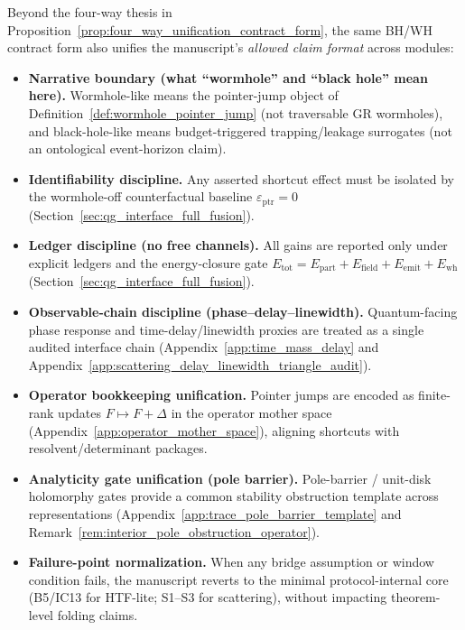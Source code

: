 \begin{remark}
\label{rem:bh_wh_additional_unifications_checklist}
\AuditTag Beyond the four-way thesis in Proposition~\ref{prop:four_way_unification_contract_form}, the same BH/WH contract form also unifies the manuscript's \emph{allowed claim format} across modules:
\begin{itemize}
\item \textbf{Narrative boundary (what ``wormhole'' and ``black hole'' mean here).}
Wormhole-like means the pointer-jump object of Definition~\ref{def:wormhole_pointer_jump} (not traversable GR wormholes), and black-hole-like means budget-triggered trapping/leakage surrogates (not an ontological event-horizon claim).
\item \textbf{Identifiability discipline.}
Any asserted shortcut effect must be isolated by the wormhole-off counterfactual baseline $\varepsilon_{\mathrm{ptr}}=0$ (Section~\ref{sec:qg_interface_full_fusion}).
\item \textbf{Ledger discipline (no free channels).}
All gains are reported only under explicit ledgers and the energy-closure gate
$E_{\mathrm{tot}}=E_{\mathrm{part}}+E_{\mathrm{field}}+E_{\mathrm{emit}}+E_{\mathrm{wh}}$ (Section~\ref{sec:qg_interface_full_fusion}).
\item \textbf{Observable-chain discipline (phase--delay--linewidth).}
Quantum-facing phase response and time-delay/linewidth proxies are treated as a single audited interface chain (Appendix~\ref{app:time_mass_delay} and Appendix~\ref{app:scattering_delay_linewidth_triangle_audit}).
\item \textbf{Operator bookkeeping unification.}
Pointer jumps are encoded as finite-rank updates $F\mapsto F+\Delta$ in the operator mother space (Appendix~\ref{app:operator_mother_space}), aligning shortcuts with resolvent/determinant packages.
\item \textbf{Analyticity gate unification (pole barrier).}
Pole-barrier / unit-disk holomorphy gates provide a common stability obstruction template across representations (Appendix~\ref{app:trace_pole_barrier_template} and Remark~\ref{rem:interior_pole_obstruction_operator}).
\item \textbf{Failure-point normalization.}
When any bridge assumption or window condition fails, the manuscript reverts to the minimal protocol-internal core (B5/IC13 for HTF-lite; S1--S3 for scattering), without impacting theorem-level folding claims.
\end{itemize}
\end{remark}

